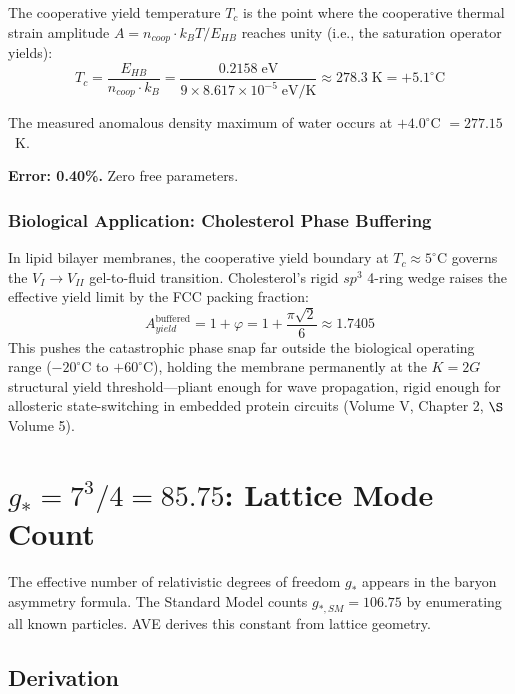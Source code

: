 The cooperative yield temperature $T_c$ is the point where the cooperative thermal strain amplitude $A = n_{coop} \cdot k_B T / E_{HB}$ reaches unity (i.e., the saturation operator yields):
\begin{equation}
    T_c = \frac{E_{HB}}{n_{coop} \cdot k_B}
        = \frac{0.2158\;\text{eV}}{9 \times 8.617 \times 10^{-5}\;\text{eV/K}}
        \approx 278.3\;\text{K}
        = +5.1^\circ\text{C}
\end{equation}

The measured anomalous density maximum of water occurs at $+4.0^\circ$C $= 277.15$~K.

\textbf{Error: 0.40\%.} Zero free parameters.

\subsubsection*{Biological Application: Cholesterol Phase Buffering}

In lipid bilayer membranes, the cooperative yield boundary at $T_c \approx 5^\circ$C governs the $V_I \to V_{II}$ gel-to-fluid transition. Cholesterol's rigid $sp^3$ 4-ring wedge raises the effective yield limit by the FCC packing fraction:
\begin{equation}
    A_{yield}^{\text{buffered}} = 1 + \varphi = 1 + \frac{\pi\sqrt{2}}{6} \approx 1.7405
\end{equation}
This pushes the catastrophic phase snap far outside the biological operating range ($-20^\circ$C to $+60^\circ$C), holding the membrane permanently at the $K = 2G$ structural yield threshold---pliant enough for wave propagation, rigid enough for allosteric state-switching in embedded protein circuits (Volume V, Chapter 2, $\S$Volume 5).

\section{$g_* = 7^3/4 = 85.75$: Lattice Mode Count}
\label{sec:g_star_derivation}

The effective number of relativistic degrees of freedom $g_*$
appears in the baryon asymmetry formula.  The Standard Model
counts $g_{*,SM} = 106.75$ by enumerating all known particles.
AVE derives this constant from lattice geometry.

\subsection{Derivation}

